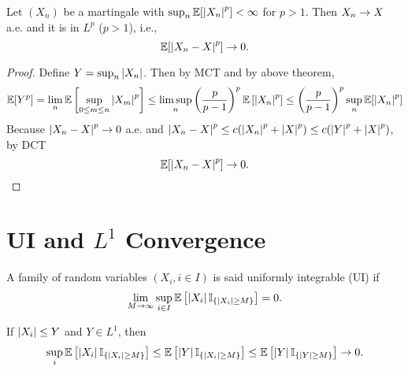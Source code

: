 \begin{thm}
    Let $(X_n)$ be a martingale with $\sup_n \mathbb{E}[\left\lvert X_n\right\lvert^p] < \infty$ for $p > 1$. Then $X_n \rightarrow X$ a.e. and it is in $L^p$ ($p > 1$), i.e.,
    \begin{equation*}
        \mathbb{E}[\left\lvert X_n - X\right\lvert^p] \rightarrow 0.
    \end{equation*}
\end{thm}
\begin{proof}
    Define $Y = \sup_{n} \left\lvert X_n\right\lvert$. Then by MCT and by above theorem,
    \begin{equation*}
        \mathbb{E}[Y^p] = \lim_n \mathbb{E}\left[\sup_{0 \leq m \leq n} \left\lvert X_m\right\lvert^p\right] \leq \limsup_n \left(\frac{p}{p-1}\right)^p \mathbb{E}\left[\left\lvert X_n\right\lvert^p\right] \leq \left(\frac{p}{p-1}\right)^p \sup_n \mathbb{E}[\left\lvert X_n\right\lvert^p]
    \end{equation*}
    Because $\left\lvert X_n - X\right\lvert^p \rightarrow 0$ a.e. and $\left\lvert X_n - X\right\lvert^p \leq c(\left\lvert X_n\right\lvert^p + \left\lvert X\right\lvert^p) \leq c(\left\lvert Y\right\lvert^p + \left\lvert X\right\lvert^p)$, by DCT
    \begin{equation*}
        \mathbb{E}[\left\lvert X_n - X\right\lvert^p] \rightarrow 0. \qedhere
    \end{equation*}
\end{proof}


\section{UI and \texorpdfstring{$L^1$}{L1} Convergence}
\begin{defn}
    A family of random variables $(X_i,i\in I)$ is said uniformly integrable (UI) if
    \begin{equation*}
        \lim_{M \rightarrow \infty} \sup_{i \in I} \mathbb{E}\left[\left\lvert X_i\right\lvert\mathbb{I}_{\left\{\left\lvert X_i\right\lvert \geq M\right\}}\right] = 0.
    \end{equation*}
\end{defn}

\begin{exam}
    If $\left\lvert X_i\right\lvert \leq Y$ and $Y \in L^1$, then
    \begin{equation*}
        \sup_i \mathbb{E}\left[\left\lvert X_i\right\lvert\mathbb{I}_{\left\{\left\lvert X_i\right\lvert \geq M\right\}}\right]  \leq \mathbb{E}\left[\left\lvert Y\right\lvert\mathbb{I}_{\left\{\left\lvert X_i\right\lvert \geq M\right\}}\right] \leq \mathbb{E}\left[\left\lvert Y\right\lvert\mathbb{I}_{\left\{\left\lvert Y\right\lvert \geq M\right\}}\right] \rightarrow 0.
    \end{equation*}
\end{exam}

